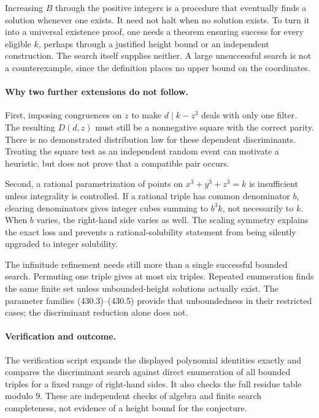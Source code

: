 \documentclass[11pt]{article}
\begin{document}
Increasing $B$ through the positive integers is a procedure that eventually finds a solution whenever one exists. It need not halt when no solution exists. To turn it into a universal existence proof, one needs a theorem ensuring success for every eligible $k$, perhaps through a justified height bound or an independent construction. The search itself supplies neither. A large unsuccessful search is not a counterexample, since the definition places no upper bound on the coordinates.

\paragraph{Why two further extensions do not follow.}
First, imposing congruences on $z$ to make $d\mid k-z^3$ deals with only one filter. The resulting $D(d,z)$ must still be a nonnegative square with the correct parity. There is no demonstrated distribution law for these dependent discriminants. Treating the square test as an independent random event can motivate a heuristic, but does not prove that a compatible pair occurs.

Second, a rational parametrization of points on $x^3+y^3+z^3=k$ is insufficient unless integrality is controlled. If a rational triple has common denominator $b$, clearing denominators gives integer cubes summing to $b^3k$, not necessarily to $k$. When $b$ varies, the right-hand side varies as well. The scaling symmetry explains the exact loss and prevents a rational-solubility statement from being silently upgraded to integer solubility.

The infinitude refinement needs still more than a single successful bounded search. Permuting one triple gives at most six triples. Repeated enumeration finds the same finite set unless unbounded-height solutions actually exist. The parameter families (430.3)--(430.5) provide that unboundedness in their restricted cases; the discriminant reduction alone does not.

\paragraph{Verification and outcome.}
The verification script expands the displayed polynomial identities exactly and compares the discriminant search against direct enumeration of all bounded triples for a fixed range of right-hand sides. It also checks the full residue table modulo $9$. These are independent checks of algebra and finite search completeness, not evidence of a height bound for the conjecture.
\end{document}
